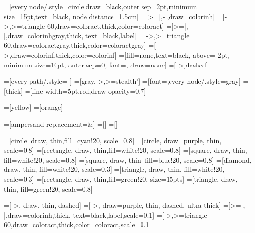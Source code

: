 =[every node/.style={circle,draw=black,outer sep=2pt,minimum
                size=15pt,text=black}, node distance=1.5cm]
=[>=|,-|,draw=colorinh]%
=[->,>=triangle 60,draw=coloract,thick,color=coloract]
=[>=|,-|,draw=colorinhgray,thick, text=black,label]
=[->,>=triangle 60,draw=coloractgray,thick,color=coloractgray]
=[->,draw=colorinf,thick,color=colorinf]
=[fill=none,text=black, above=-2pt,%
minimum size=10pt, outer sep=0, font=\scriptsize, draw=none]
=[->,dashed]


=[every path/.style={-}]
=[gray,->,>=stealth']
=[font=\scriptsize,every node/.style={gray}]
=[thick]
=[line width=5pt,red,draw opacity=0.7]

=[yellow]
=[orange]

=[ampersand replacement=\&]
=[]
=[]


=[circle, draw, thin,fill=cyan!20, scale=0.8] %
=[circle, draw=purple, thin, scale=0.8] %
=[rectangle, draw, thin,fill=white!20, scale=0.8] %
=[square, draw, thin, fill=white!20, scale=0.8] %
=[square, draw, thin, fill=blue!20, scale=0.8] %
=[diamond, draw, thin, fill=white!20, scale=0.3]
=[triangle, draw, thin, fill=white!20, scale=0.3]
=[rectangle, draw, thin,fill=green!20, size=15pts]
=[triangle, draw, thin, fill=green!20, scale=0.8]

=[->, draw, thin, dashed] %
=[->, draw=purple, thin, dashed, ultra thick]
=[>=|,-|,draw=colorinh,thick, text=black,label,scale=0.1]
=[->,>=triangle 60,draw=coloract,thick,color=coloract,scale=0.1]



